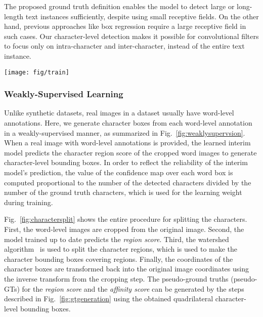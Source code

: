 \documentclass[10pt,twocolumn,letterpaper]{article}
\begin{document}
The proposed ground truth definition enables the model to detect large or long-length text instances sufficiently, despite using small receptive fields. On the other hand, previous approaches like box regression require a large receptive field in such cases. Our character-level detection makes it possible for convolutional filters to focus only on intra-character and inter-character, instead of the entire text instance.

\begin{figure*}[t]
  \centering
  \texttt{[image: fig/train]}
  \caption{Illustration of the overall training stream for the proposed method. Training is carried out using both real and synthetic images in a weakly-supervised fashion.}
\label{fig:weaklysupervsion} 
\end{figure*}

\subsubsection{Weakly-Supervised Learning}
Unlike synthetic datasets, real images in a dataset usually have word-level annotations. Here, we generate character boxes from each word-level annotation in a weakly-supervised manner, as summarized in Fig.~\ref{fig:weaklysupervsion}. When a real image with word-level annotations is provided, the learned interim model predicts the character region score of the cropped word images to generate character-level bounding boxes. In order to reflect the reliability of the interim model's prediction, the value of the confidence map over each word box is computed proportional to the number of the detected characters divided by the number of the ground truth characters, which is used for the learning weight during training.

Fig.~\ref{fig:charactersplit} shows the entire procedure for splitting the characters. First, the word-level images are cropped from the original image. Second, the model trained up to date predicts the \textit{region score}. Third, the watershed algorithm~\cite{vincent1991watersheds} is used to split the character regions, which is used to make the character bounding boxes covering regions. Finally, the coordinates of the character boxes are transformed back into the original image coordinates using the inverse transform from the cropping step. The pseudo-ground truths (pseudo-GTs) for the \textit{region score} and the \textit{affinity score} can be generated by the steps described in Fig.~\ref{fig:gtgeneration} using the obtained quadrilateral character-level bounding boxes.
\end{document}
